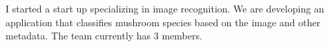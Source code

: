 \documentclass[10pt,A4]{article}
\begin{document}
\begin{minipage}{0.59\textwidth}
{		%
		\parbox[b][3cm][c]{2.9cm}{
			\textcolor{textcol}{I started a start up specializing in image recognition. We are developing an application that classifies mushroom species based on the image and other metadata. The team currently has 3 members. }
		}

	}
\end{minipage}
\begin{minipage}{0.05\textwidth}
	\begin{center}
	\end{center}
\end{minipage}
\end{document}
